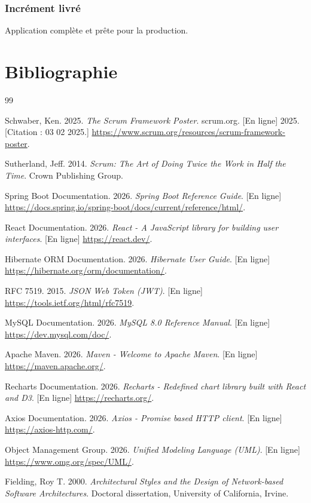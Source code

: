 \documentclass[12pt,a4paper]{report}
\begin{document}
\subsection*{Incrément livré}
Application complète et prête pour la production.


\chapter*{Bibliographie}

\begin{thebibliography}{99}

Schwaber, Ken. 2025. \emph{The Scrum Framework Poster}. scrum.org. [En ligne] 2025. [Citation : 03 02 2025.] \url{https://www.scrum.org/resources/scrum-framework-poster}.

Sutherland, Jeff. 2014. \emph{Scrum: The Art of Doing Twice the Work in Half the Time}. Crown Publishing Group.

Spring Boot Documentation. 2026. \emph{Spring Boot Reference Guide}. [En ligne] \url{https://docs.spring.io/spring-boot/docs/current/reference/html/}.

React Documentation. 2026. \emph{React - A JavaScript library for building user interfaces}. [En ligne] \url{https://react.dev/}.

Hibernate ORM Documentation. 2026. \emph{Hibernate User Guide}. [En ligne] \url{https://hibernate.org/orm/documentation/}.

RFC 7519. 2015. \emph{JSON Web Token (JWT)}. [En ligne] \url{https://tools.ietf.org/html/rfc7519}.

MySQL Documentation. 2026. \emph{MySQL 8.0 Reference Manual}. [En ligne] \url{https://dev.mysql.com/doc/}.

Apache Maven. 2026. \emph{Maven - Welcome to Apache Maven}. [En ligne] \url{https://maven.apache.org/}.

Recharts Documentation. 2026. \emph{Recharts - Redefined chart library built with React and D3}. [En ligne] \url{https://recharts.org/}.

Axios Documentation. 2026. \emph{Axios - Promise based HTTP client}. [En ligne] \url{https://axios-http.com/}.

Object Management Group. 2026. \emph{Unified Modeling Language (UML)}. [En ligne] \url{https://www.omg.org/spec/UML/}.

Fielding, Roy T. 2000. \emph{Architectural Styles and the Design of Network-based Software Architectures}. Doctoral dissertation, University of California, Irvine.

\end{thebibliography}
\end{document}
